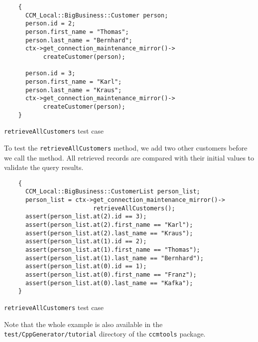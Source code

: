 \begin{Example}
\begin{minifbox}
\begin{small}
\begin{verbatim}
    {
      CCM_Local::BigBusiness::Customer person;
      person.id = 2;
      person.first_name = "Thomas";
      person.last_name = "Bernhard";
      ctx->get_connection_maintenance_mirror()->
           createCustomer(person);

      person.id = 3;
      person.first_name = "Karl";
      person.last_name = "Kraus";
      ctx->get_connection_maintenance_mirror()->
           createCustomer(person);
    }
\end{verbatim}
\end{small}
\end{minifbox}
\caption{{\tt retrieveAllCustomers} test case}
\label{example:retrieveAllCustomersTest}
\end{Example}

To test the {\tt retrieveAllCustomers} method, we add two other customers before
we call the method. All retrieved records are compared with their initial values
to validate the query results. 

\begin{Example}
\begin{minifbox}
\begin{small}
\begin{verbatim}
    {
      CCM_Local::BigBusiness::CustomerList person_list;
      person_list = ctx->get_connection_maintenance_mirror()->
                         retrieveAllCustomers();
      assert(person_list.at(2).id == 3);
      assert(person_list.at(2).first_name == "Karl");
      assert(person_list.at(2).last_name == "Kraus");
      assert(person_list.at(1).id == 2);
      assert(person_list.at(1).first_name == "Thomas");
      assert(person_list.at(1).last_name == "Bernhard");
      assert(person_list.at(0).id == 1);
      assert(person_list.at(0).first_name == "Franz");
      assert(person_list.at(0).last_name == "Kafka");
    }      
\end{verbatim}
\end{small}
\end{minifbox}
\caption{{\tt retrieveAllCustomers} test case}
\label{example:retrieveAllCustomersTest}
\end{Example}

Note that the whole example is also available in the 
{\tt test/CppGenerator/tutorial} directory of the {\tt ccmtools} package. 


